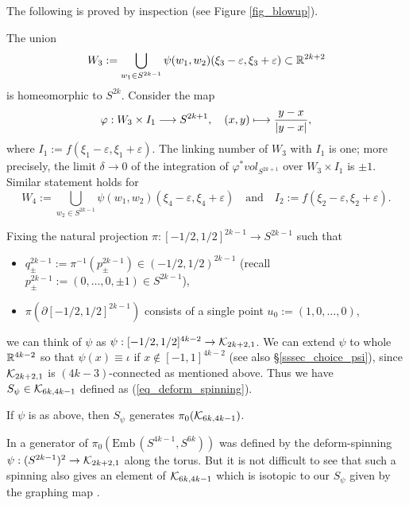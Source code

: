 The following is proved by inspection (see Figure \ref{fig_blowup}).


\begin{lem}\label{lem_linking_number}
The union
\[
 W_3 := \bigcup_{w_1 \in S^{2k-1}}\psi (w_1 ,w_2 ) (\xi_3 -\varepsilon ,\xi_3 + \varepsilon ) \subset \mathbb{R}^{2k+2}
\]
is homeomorphic to $S^{2k}$.
Consider the map
\[
 \varphi : W_3 \times I_1 \longrightarrow S^{2k+1}, \quad (x,y) \longmapsto \frac{y-x}{\lvert {y-x} \rvert},
\]
where $I_1 := f(\xi_1 -\varepsilon ,\xi_1 +\varepsilon )$.
The linking number of $W_3$ with $I_1$ is one; more precisely, the limit $\delta \to 0$ of the integration of
$\varphi^* vol_{S^{2k+1}}$ over $W_3 \times I_1$ is $\pm 1$.
Similar statement holds for
\[
 W_4 := \bigcup_{w_2 \in S^{2k-1}}\psi (w_1 ,w_2 ) (\xi_4 -\varepsilon ,\xi_4 + \varepsilon ) \quad \text{and}\quad
 I_2 := f(\xi_2 -\varepsilon ,\xi_2 +\varepsilon ).
\]
\end{lem}


Fixing the natural projection $\pi : [-1/2,1/2]^{2k-1} \to S^{2k-1}$ such that
\begin{itemize}
\item
 $q^{2k-1}_{\pm}:=\pi^{-1}(p^{2k-1}_{\pm}) \in (-1/2,1/2)^{2k-1}$ (recall
 $p^{2k-1}_{\pm}:=(0,\dots ,0,\pm 1) \in S^{2k-1}$),
\item
 $\pi (\partial [-1/2,1/2]^{2k-1})$ consists of a single point $u_0 := (1,0,\dots ,0)$,
\end{itemize}
we can think of $\psi$ as $\psi :[-1/2,1/2]^{4k-2} \to \mathcal{K}_{2k+2 ,1}$.
We can extend $\psi$ to whole $\mathbb{R}^{4k-2}$ so that $\psi (x)\equiv \iota$ if $x \not\in [-1,1]^{4k-2}$
(see also \S \ref{sssec_choice_psi}), since $\mathcal{K}_{2k+2 ,1}$ is $(4k-3)$-connected as mentioned above.
Thus we have $S_{\psi}\in \mathcal{K}_{6k ,4k-1}$ defined as (\ref{eq_deform_spinning}).


\begin{thm}
If $\psi$ is as above, then $S_{\psi}$ generates $\pi_0 (\mathcal{K}_{6k ,4k-1})$.
\end{thm}


\begin{rem}
In \cite{RosemanTakase07} a generator of $\pi_0 (\text{Emb}\, (S^{4k-1},S^{6k}))$ was defined by the
deform-spinning $\psi :(S^{2k-1})^2 \to \mathcal{K}_{2k+2 ,1}$ along the torus.
But it is not difficult to see that such a spinning also gives an element of $\mathcal{K}_{6k ,4k-1}$ which is isotopic to our
$S_{\psi}$ given by the graphing map \cite{Budney08}.
\end{rem}


